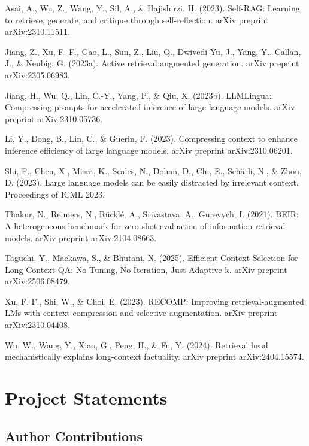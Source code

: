 \documentclass[11pt]{article}
\begin{document}
Asai, A., Wu, Z., Wang, Y., Sil, A., \& Hajishirzi, H. (2023). Self-RAG: Learning to retrieve, generate, and critique through self-reflection. arXiv preprint arXiv:2310.11511.


Jiang, Z., Xu, F. F., Gao, L., Sun, Z., Liu, Q., Dwivedi-Yu, J., Yang, Y., Callan, J., \& Neubig, G. (2023a). Active retrieval augmented generation. arXiv preprint arXiv:2305.06983.


Jiang, H., Wu, Q., Lin, C.-Y., Yang, P., \& Qiu, X. (2023b). LLMLingua: Compressing prompts for accelerated inference of large language models. arXiv preprint arXiv:2310.05736.


Li, Y., Dong, B., Lin, C., \& Guerin, F. (2023). Compressing context to enhance inference efficiency of large language models. arXiv preprint arXiv:2310.06201.


Shi, F., Chen, X., Misra, K., Scales, N., Dohan, D., Chi, E., Schärli, N., \& Zhou, D. (2023). Large language models can be easily distracted by irrelevant context. Proceedings of ICML 2023.


Thakur, N., Reimers, N., Rücklé, A., Srivastava, A., Gurevych, I. (2021). BEIR: A heterogeneous benchmark for zero-shot evaluation of information retrieval models. arXiv preprint arXiv:2104.08663.


Taguchi, Y., Maekawa, S., \& Bhutani, N. (2025). Efficient Context Selection for Long-Context QA: No Tuning, No Iteration, Just Adaptive-k. arXiv preprint arXiv:2506.08479.


Xu, F. F., Shi, W., \& Choi, E. (2023). RECOMP: Improving retrieval-augmented LMs with context compression and selective augmentation. arXiv preprint arXiv:2310.04408.


Wu, W., Wang, Y., Xiao, G., Peng, H., \& Fu, Y. (2024). Retrieval head mechanistically explains long-context factuality. arXiv preprint arXiv:2404.15574.


\appendix
\section{Project Statements}
\subsection*{Author Contributions}
\end{document}

